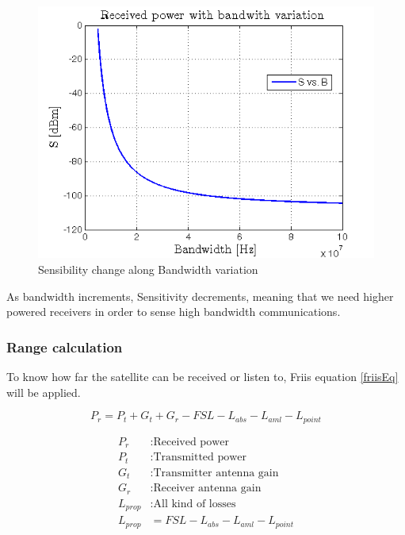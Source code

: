 \begin{figure}[H]
\includegraphics[scale=0.9]{./sections/SatelliteDept/sections/images/SvsB}
\centering
\caption{Sensibility change along Bandwidth variation}
\label{SvsB}
\end{figure}

As bandwidth increments, Sensitivity decrements, meaning that we need higher powered receivers in order to sense high bandwidth communications.

\subsubsection{Range calculation}
To know how far the satellite can be received or listen to, Friis equation \ref{friisEq} will be applied.
 
\begin{equation}
	P_r=P_t+G_t+G_r -FSL -L_{abs}-L_{aml}-L_{point}
	\label{friisEq}
\end{equation}

\begin{align*}
		P_r&:\text{Received power}\\
		P_t&:\text{Transmitted power}\\
		G_t&:\text{Transmitter antenna gain}\\
		G_r&:\text{Receiver antenna gain}\\
		L_{prop}&:\text{All kind of losses}\\
		L_{prop}&=FSL -L_{abs}-L_{aml}-L_{point}  	
\end{align*}

